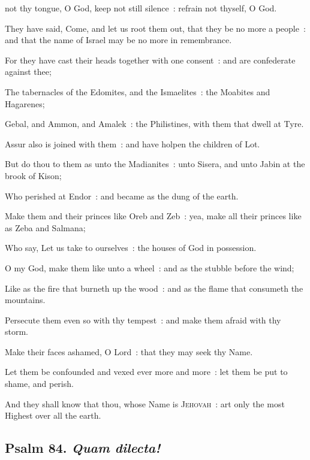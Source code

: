  not thy tongue, O God, keep not still silence~: refrain not thyself, O God.\par
{}
They have said, Come, and let us root them out, that they be no more a people~: and that the name of Israel may be no more in remembrance.\par
{}For they have cast their heads together with one consent~: and are confederate against thee;\par
{}The tabernacles of the Edomites, and the Ismaelites~: the Moabites and Hagarenes;\par
{}Gebal, and Ammon, and Amalek~: the Philistines, with them that dwell at Tyre.\par
{}Assur also is joined with them~: and have holpen the children of Lot.\par
{}But do thou to them as unto the Madianites~: unto Sisera, and unto Jabin at the brook of Kison;\par
{}Who perished at Endor~: and became as the dung of the earth.\par
{}Make them and their princes like Oreb and Zeb~: yea, make all their princes like as Zeba and Salmana;\par
{}Who say, Let us take to ourselves~: the houses of God in possession.\par
{}O my God, make them like unto a wheel~: and as the stubble before the wind;\par
{}Like as the fire that burneth up the wood~: and as the flame that consumeth the mountains.\par
{}Persecute them even so with thy tempest~: and make them afraid with thy storm.\par
{}Make their faces ashamed, O Lord~: that they may seek thy Name.\par
{}Let them be confounded and vexed ever more and more~: let them be put to shame, and perish.\par
{}And they shall know that thou, whose Name is \textsc{Jehovah}~: art only the most Highest over all the earth.\par


\clearpage
\subsection{Psalm 84. \textit{Quam dilecta!}}


